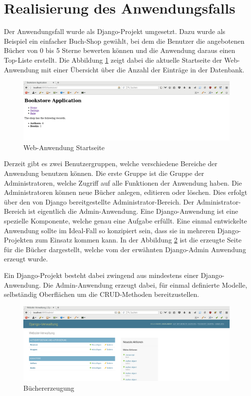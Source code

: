 \section{Realisierung des Anwendungsfalls}
Der Anwendungsfall wurde als Django-Projekt umgesetzt. Dazu wurde als Beispiel
ein einfacher Buch-Shop gewählt, bei dem die Benutzer die angebotenen Bücher von
0 bis 5 Sterne bewerten können und die Anwendung daraus einen Top-Liste erstellt.
Die Abbildung \ref{fig:django-start} zeigt dabei die aktuelle Startseite der
Web-Anwendung mit einer Übersicht über die Anzahl der Einträge in der Datenbank.

\begin{figure}
\centering
\includegraphics[scale=0.25]{images/Web-Application-Entry.png}
\caption{Web-Anwendung Startseite}
\label{fig:django-start}
\end{figure}

Derzeit gibt es zwei Benutzergruppen, welche verschiedene Bereiche der Anwendung
benutzen können. Die erste Gruppe ist die Gruppe der Administratoren, welche
Zugriff auf alle Funktionen der Anwendung haben. Die Administratoren können neue
Bücher anlegen, editieren oder löschen. Dies erfolgt über den von Django
bereitgestellte Administrator-Bereich. Der Administrator-Bereich ist eigentlich
die Admin-Anwendung. Eine Django-Anwendung ist eine spezielle Komponente, welche
genau eine Aufgabe erfüllt. Eine einmal entwickelte Anwendung sollte im
Ideal-Fall so konzipiert sein, dass sie in mehreren Django-Projekten zum Einsatz
kommen kann. In der Abbildung \ref{fig:django-create} ist die erzeugte Seite
für die Bücher dargestellt, welche vom der erwähnten Django-Admin Anwendung
erzeugt wurde.

Ein Django-Projekt besteht dabei zwingend aus mindestens einer
Django-Anwendung. Die Admin-Anwendung erzeugt dabei, für einmal definierte
Modelle, selbständig Oberflächen um die CRUD-Methoden bereitzustellen.

\begin{figure}
\centering
\includegraphics[scale=0.25]{images/Creation.png}
\caption{Büchererzeugung}
\label{fig:django-create}
\end{figure}

